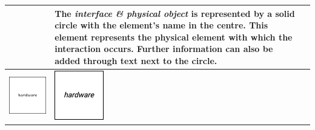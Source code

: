 \begin{longtable}{|m{}|m{}|m{}|}
    & 
    The \textit{interface \& physical object} is represented by a solid circle with the element's name in the centre. This element represents the physical element with which the interaction occurs. Further information can also be added through text next to the circle.
    \\\hline
    \centering
    \includegraphics[width=0.75\linewidth]{chapters/4-MDC_model_application/image/bvl-hardware-o.png}
    &
    \centering
    \includegraphics[width=0.75\linewidth]{chapters/4-MDC_model_application/image/bvl-hardware.png}

\end{longtable}
